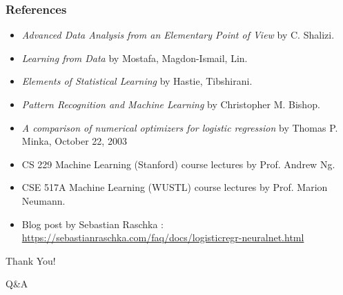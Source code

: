 \documentclass{beamer}
\begin{document}
\begin{frame}
\frametitle{References}
\begin{itemize}
\item \textit{Advanced Data Analysis from an Elementary Point of View} by C. Shalizi.
\item \textit{Learning from Data} by Mostafa, Magdon-Ismail, Lin.
\item \textit{Elements of Statistical Learning} by Hastie, Tibshirani.
\item \textit{Pattern Recognition and Machine Learning} by Christopher M. Bishop.
\item \textit{A comparison of numerical optimizers for logistic regression} by Thomas P. Minka, October 22, 2003
\item CS 229 Machine Learning (Stanford) course lectures by Prof. Andrew Ng.
\item CSE 517A Machine Learning (WUSTL) course lectures by Prof. Marion Neumann.
\item Blog post by Sebastian Raschka : \url{https://sebastianraschka.com/faq/docs/logisticregr-neuralnet.html}
\end{itemize}
\end{frame}
\begin{frame}
\Huge{\centerline{Thank You!}}
\end{frame}
\begin{frame}
\Huge{\centerline{Q\&A}}
\end{frame}


\end{document}
